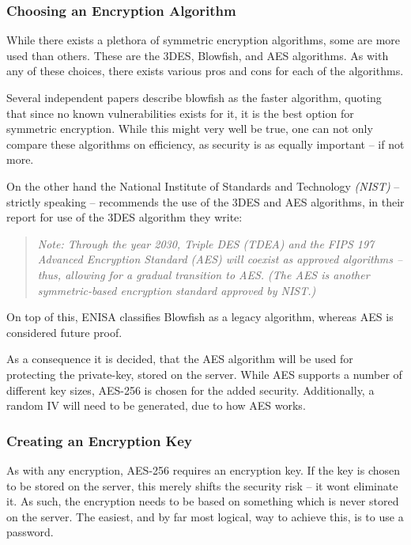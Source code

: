 			\subsubsection{Choosing an Encryption Algorithm}
				While there exists a plethora of symmetric encryption algorithms, some are more used than others. These are the 3DES, Blowfish, and AES algorithms. As with any of these choices, there exists various pros and cons for each of the algorithms. 

				Several independent papers describe blowfish as the faster algorithm, quoting that since no known vulnerabilities exists for it, it is the best option for symmetric encryption\cite{thakur2011aes,singh2011comparison,verma2011peformance,ramesh2013performance}. While this might very well be true, one can not only compare these algorithms on efficiency, as security is as equally important -- if not more. 

				On the other hand the National Institute of Standards and Technology \emph{(NIST)} -- strictly speaking -- recommends the use of the 3DES and AES algorithms\cite{barker2012sp}, in their report for use of the 3DES algorithm they write:
				\begin{quote}
					\emph{Note: Through the year 2030, Triple DES (TDEA) and the FIPS 197 Advanced Encryption Standard (AES) will coexist as approved algorithms – thus, allowing for a gradual transition to AES. (The AES is another symmetric-based encryption standard approved by NIST.)}\\
					\cite{barker2012sp}
				\end{quote}
				On top of this, ENISA classifies Blowfish as a legacy algorithm, whereas AES is considered future proof\cite[p.20]{enisa}.

				As a consequence it is decided, that the AES algorithm will be used for protecting the private-key, stored on the server. While AES supports a number of different key sizes, AES-256 is chosen for the added security. Additionally, a random IV will need to be generated, due to how AES works.

			\subsubsection{Creating an Encryption Key}
				\label{sec:kdf}
				As with any encryption, AES-256 requires an encryption key. If the key is chosen to be stored on the server, this merely shifts the security risk -- it wont eliminate it. As such, the encryption needs to be based on something which is never stored on the server. The easiest, and by far most logical, way to achieve this, is to use a password. 

